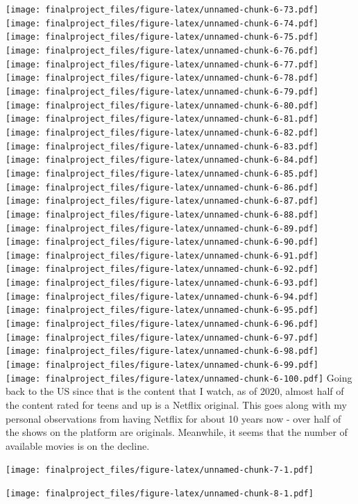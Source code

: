 \documentclass[
]{article}
\begin{document}
\texttt{[image: finalproject\_files/figure-latex/unnamed-chunk-6-73.pdf]}
\texttt{[image: finalproject\_files/figure-latex/unnamed-chunk-6-74.pdf]}
\texttt{[image: finalproject\_files/figure-latex/unnamed-chunk-6-75.pdf]}
\texttt{[image: finalproject\_files/figure-latex/unnamed-chunk-6-76.pdf]}
\texttt{[image: finalproject\_files/figure-latex/unnamed-chunk-6-77.pdf]}
\texttt{[image: finalproject\_files/figure-latex/unnamed-chunk-6-78.pdf]}
\texttt{[image: finalproject\_files/figure-latex/unnamed-chunk-6-79.pdf]}
\texttt{[image: finalproject\_files/figure-latex/unnamed-chunk-6-80.pdf]}
\texttt{[image: finalproject\_files/figure-latex/unnamed-chunk-6-81.pdf]}
\texttt{[image: finalproject\_files/figure-latex/unnamed-chunk-6-82.pdf]}
\texttt{[image: finalproject\_files/figure-latex/unnamed-chunk-6-83.pdf]}
\texttt{[image: finalproject\_files/figure-latex/unnamed-chunk-6-84.pdf]}
\texttt{[image: finalproject\_files/figure-latex/unnamed-chunk-6-85.pdf]}
\texttt{[image: finalproject\_files/figure-latex/unnamed-chunk-6-86.pdf]}
\texttt{[image: finalproject\_files/figure-latex/unnamed-chunk-6-87.pdf]}
\texttt{[image: finalproject\_files/figure-latex/unnamed-chunk-6-88.pdf]}
\texttt{[image: finalproject\_files/figure-latex/unnamed-chunk-6-89.pdf]}
\texttt{[image: finalproject\_files/figure-latex/unnamed-chunk-6-90.pdf]}
\texttt{[image: finalproject\_files/figure-latex/unnamed-chunk-6-91.pdf]}
\texttt{[image: finalproject\_files/figure-latex/unnamed-chunk-6-92.pdf]}
\texttt{[image: finalproject\_files/figure-latex/unnamed-chunk-6-93.pdf]}
\texttt{[image: finalproject\_files/figure-latex/unnamed-chunk-6-94.pdf]}
\texttt{[image: finalproject\_files/figure-latex/unnamed-chunk-6-95.pdf]}
\texttt{[image: finalproject\_files/figure-latex/unnamed-chunk-6-96.pdf]}
\texttt{[image: finalproject\_files/figure-latex/unnamed-chunk-6-97.pdf]}
\texttt{[image: finalproject\_files/figure-latex/unnamed-chunk-6-98.pdf]}
\texttt{[image: finalproject\_files/figure-latex/unnamed-chunk-6-99.pdf]}
\texttt{[image: finalproject\_files/figure-latex/unnamed-chunk-6-100.pdf]}
Going back to the US since that is the content that I watch, as of 2020,
almost half of the content rated for teens and up is a Netflix original.
This goes along with my personal observations from having Netflix for
about 10 years now - over half of the shows on the platform are
originals. Meanwhile, it seems that the number of available movies is on
the decline.

\texttt{[image: finalproject\_files/figure-latex/unnamed-chunk-7-1.pdf]}

\texttt{[image: finalproject\_files/figure-latex/unnamed-chunk-8-1.pdf]}
\end{document}
